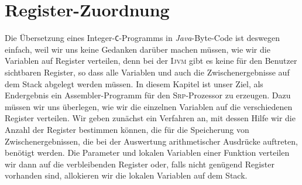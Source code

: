 \chapter{Register-Zuordnung}
Die \"Ubersetzung eines Integer-\texttt{C}-Programms in \textsl{Java}-Byte-Code ist deswegen einfach, weil
wir uns keine Gedanken dar\"uber machen m\"ussen, wie wir die Variablen auf Register verteilen, denn bei der
\textsc{Ijvm} gibt es keine f\"ur den Benutzer sichtbaren Register, so dass alle Variablen und auch die
Zwischenergebnisse auf dem Stack abgelegt werden m\"ussen.  In diesem Kapitel ist unser Ziel,
als Endergebnis ein Assembler-Programm f\"ur den \textsc{Srp}-Prozessor zu erzeugen.  Dazu m\"ussen wir
uns \"uberlegen, wie wir die einzelnen Variablen auf die verschiedenen Register verteilen.
Wir geben zun\"achst ein Verfahren an, mit dessen Hilfe wir die Anzahl der Register
bestimmen k\"onnen,  die f\"ur die Speicherung von Zwischenergebnissen, die bei der Auswertung
arithmetischer Ausdr\"ucke auftreten, ben\"otigt werden.
  Die Parameter und lokalen Variablen einer Funktion verteilen wir dann auf die
verbleibenden Register oder, falls nicht gen\"ugend Register vorhanden sind, allokieren wir
die lokalen Variablen auf dem Stack.

